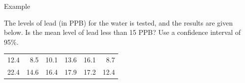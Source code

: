 \begin{frame}{Example}

  The levels of lead (in PPB) for the water is tested, and the results
  are given below. Is the mean level of lead less than 15 PPB? Use a
  confidence interval of 95\%.

\begin{tabular}{rrrrrr}
  12.4  & 8.5  & 10.1 & 13.6 & 16.1 & 8.7 \\
  22.4  & 14.6 & 16.4 & 17.9 & 17.2 & 12.4
\end{tabular}


\vfill



  
\end{frame}



